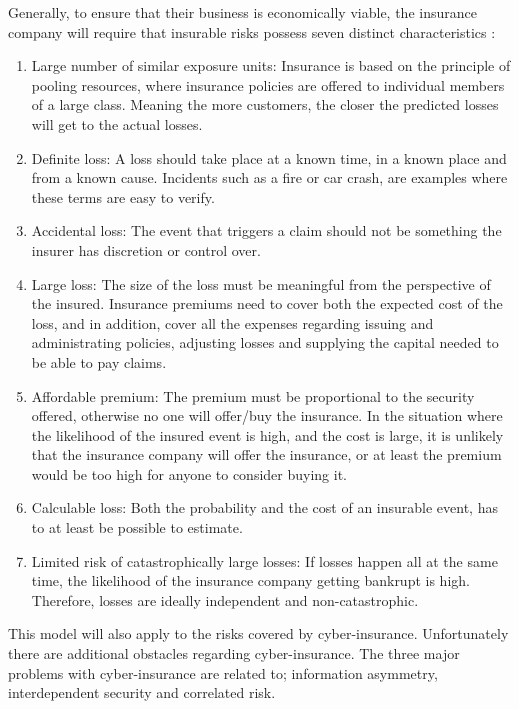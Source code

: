 Generally, to ensure that their business is economically viable, the insurance company will require that insurable risks possess seven distinct characteristics \cite{mehr1980principles}: 
   \begin{enumerate}
   \item Large number of similar exposure units: Insurance is based on the principle of pooling resources, where insurance policies are offered to individual members of a large class. Meaning the more customers, the closer the predicted losses will get to the actual losses.
   \item Definite loss: A loss should take place at a known time, in a known place and from a known
    cause. Incidents such as a fire or car crash, are examples where these terms are easy to verify.
   \item Accidental loss: The event that triggers a claim should not be 
   something the insurer has discretion or control over.
   \item Large loss: The size of the loss must be meaningful from the perspective of the insured.
    Insurance premiums need to cover both the expected cost of the loss, and in addition, 
    cover all the expenses regarding issuing and administrating policies, adjusting losses and
     supplying the capital needed to be able to pay claims.
   \item Affordable premium: The premium must be proportional to the security offered, otherwise no
    one will offer/buy the insurance. In the situation where the likelihood of the insured event is
     high, and the cost is large, it is unlikely that the insurance company will offer the insurance,
      or at least the premium would be too high for anyone to consider buying it. 
   \item Calculable loss: Both the probability and the cost of an insurable event,
    has to at least be possible to estimate. 
   \item Limited risk of catastrophically large losses: If losses happen all at the same time, the likelihood of
    the insurance company getting bankrupt is high. Therefore, losses are ideally independent and non-catastrophic. 
   \end{enumerate}
   
This model will also apply to the risks covered by cyber-insurance. Unfortunately there are additional obstacles regarding cyber-insurance. The three major problems with cyber-insurance are related to; information asymmetry, interdependent security and correlated risk. 
 
